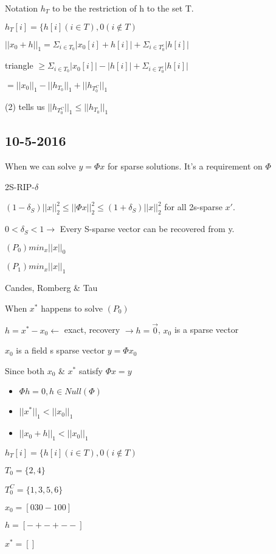 \documentclass[12pt,letterpaper]{report}
\begin{document}
Notation $h_T$ to be the restriction of h to the set T.

$h_T[i] = \{ h[i] (i \in T), 0 (i \not\in T)$

$||x_0 + h||_1 = \Sigma_{i \in T_0} |x_0[i] + h[i]| + \Sigma_{i \in T_0^c}|h[i]|$

triangle $\geq \Sigma_{i \in T_0} |x_0[i]| - |h[i]| + \Sigma_{i \in T_0^c}|h[i]|$

$= ||x_0||_1 - ||h_{T_0}||_1 + ||h_{T_0^C}||_1$

(2) tells us $||h_{T_0^C}||_1 \leq ||h_{T_0}||_1$


\subsection*{10-5-2016}

When we can solve $y = \Phi x$ for sparse solutions.  It's a requirement on $\Phi$

2S-RIP-$\delta$

$(1-\delta_S)||x||_2^2 \leq ||\Phi x||_2^2 \leq (1+\delta_S)||x||_2^2$ for all 2s-sparse $x'$.

$0 < \delta_S < 1 \rightarrow$ Every S-sparse vector can be recovered from y.


$(P_0) min_x ||x||_0$

$(P_1) min_x ||x||_1$

Candes, Romberg \& Tau

When $x^*$ happens to solve $(P_0)$

$h = x^* - x_0 \leftarrow$ exact, recovery $\rightarrow h = \vec{0}$, $x_0$ is a sparse vector

$x_0$ is a field s sparse vector $y = \Phi x_0$

Since both $x_0$ \& $x^*$ satisfy $\Phi x = y$

\begin{itemize}
\item $\Phi h = 0, h \in Null(\Phi)$
\item $||x^*||_1 < ||x_0||_1$
\item $||x_0 + h||_1 < ||x_0||_1$
\end{itemize}

$h_T[i] = \{ h[i] (i \in T), 0 (i \not\in T)$


$T_0 = \{2,4\}$

$T_0^C = \{1,3,5,6\}$

$x_0 = [0 3 0 -1 0 0]$

$h = [- + - + - -]$

$x^* = [ ]$
\end{document}

